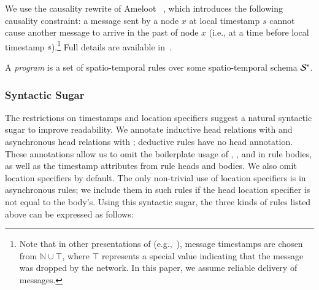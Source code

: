 We use the causality rewrite of Ameloot \etal~\cite{ameloot-operational}, which introduces the following causality constraint: a message sent by a node $x$ at local timestamp $s$ cannot cause another message to arrive in the past of node $x$ (i.e., at a time before local timestamp $s$).\footnote{Note that in
  other presentations of \lang (e.g.,~\cite{dedalus}), message timestamps are
  chosen from $\mathbb{N} \cup \top$, where $\top$ represents a special value
  indicating that the message was dropped by the network. In this paper, we
  assume reliable delivery of messages.}  Full details are available in~\cite{ameloot-operational}.

A \lang \emph{program} is a set of spatio-temporal rules over some
spatio-temporal schema $\stschema$.  

\subsubsection{Syntactic Sugar}
The restrictions on timestamps and location specifiers suggest a natural
syntactic sugar to improve readability.  We annotate inductive head relations
with  and asynchronous head relations with ;
deductive rules have no head annotation.  These annotations allow us to omit the
boilerplate usage of , ,  and
 in rule bodies, as well as the timestamp attributes from rule
heads and bodies.  We also omit location specifiers by default. The only
non-trivial use of location specifiers is in asynchronous rules; we include them
in such rules if the head location specifier is not equal to the body's. Using
this syntactic sugar, the three kinds of rules listed above can be expressed as
follows:

